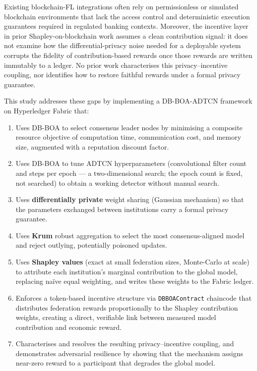 Existing blockchain-FL integrations often rely on permissionless or simulated blockchain environments that lack the access control and deterministic execution guarantees required in regulated banking contexts. Moreover, the incentive layer in prior Shapley-on-blockchain work assumes a clean contribution signal: it does not examine how the differential-privacy noise needed for a deployable system corrupts the fidelity of contribution-based rewards once those rewards are written immutably to a ledger. No prior work characterises this privacy--incentive coupling, nor identifies how to restore faithful rewards under a formal privacy guarantee.

This study addresses these gaps by implementing a DB-BOA-ADTCN framework on Hyperledger Fabric that:
\begin{enumerate}
  \item Uses DB-BOA to select consensus leader nodes by minimising a composite resource objective of computation time, communication cost, and memory size, augmented with a reputation discount factor.
  \item Uses DB-BOA to tune ADTCN hyperparameters (convolutional filter count and steps per epoch --- a two-dimensional search; the epoch count is fixed, not searched) to obtain a working detector without manual search.
  \item Uses \textbf{differentially private} weight sharing (Gaussian mechanism) so that the parameters exchanged between institutions carry a formal privacy guarantee.
  \item Uses \textbf{Krum} robust aggregation to select the most consensus-aligned model and reject outlying, potentially poisoned updates.
  \item Uses \textbf{Shapley values} (exact at small federation sizes, Monte-Carlo at scale) to attribute each institution's marginal contribution to the global model, replacing na\"ive equal weighting, and writes these weights to the Fabric ledger.
  \item Enforces a token-based incentive structure via \texttt{DBBOAContract} chaincode that distributes federation rewards proportionally to the Shapley contribution weights, creating a direct, verifiable link between measured model contribution and economic reward.
  \item Characterises and resolves the resulting privacy--incentive coupling, and demonstrates adversarial resilience by showing that the mechanism assigns near-zero reward to a participant that degrades the global model.
\end{enumerate}

